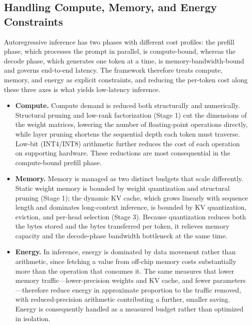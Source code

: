 \subsection{Handling Compute, Memory, and Energy Constraints}

Autoregressive inference has two phases with different cost profiles: the prefill phase, which processes the prompt in parallel, is compute-bound, whereas the decode phase, which generates one token at a time, is memory-bandwidth-bound and governs end-to-end latency. The framework therefore treats compute, memory, and energy as explicit constraints, and reducing the per-token cost along these three axes is what yields low-latency inference.

\begin{itemize}

  \item \textbf{Compute.} Compute demand is reduced both structurally and numerically. Structural pruning and low-rank factorization (Stage 1) cut the dimensions of the weight matrices, lowering the number of floating-point operations directly, while layer pruning shortens the sequential depth each token must traverse. Low-bit (INT4/INT8) arithmetic further reduces the cost of each operation on supporting hardware. These reductions are most consequential in the compute-bound prefill phase.

  \item \textbf{Memory.} Memory is managed as two distinct budgets that scale differently. Static weight memory is bounded by weight quantization and structural pruning (Stage 1); the dynamic KV cache, which grows linearly with sequence length and dominates long-context inference, is bounded by KV quantization, eviction, and per-head selection (Stage 3). Because quantization reduces both the bytes stored and the bytes transferred per token, it relieves memory capacity and the decode-phase bandwidth bottleneck at the same time.

  \item \textbf{Energy.} In inference, energy is dominated by data movement rather than arithmetic, since fetching a value from off-chip memory costs substantially more than the operation that consumes it. The same measures that lower memory traffic---lower-precision weights and KV cache, and fewer parameters---therefore reduce energy in approximate proportion to the traffic removed, with reduced-precision arithmetic contributing a further, smaller saving. Energy is consequently handled as a measured budget rather than optimized in isolation.

\end{itemize}

